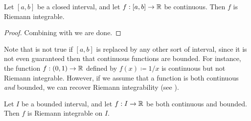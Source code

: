 \begin{cor}\label{i:11.5.2}
  Let \([a, b]\) be a closed interval, and let \(f : [a, b] \to \mathbb{R}\) be continuous.
  Then \(f\) is Riemann integrable.
\end{cor}

\begin{proof}
  Combining  with  we are done.
\end{proof}

\begin{note}
  Note that  is not true if \([a, b]\) is replaced by any other sort of interval, since it is not even guaranteed then that continuous functions are bounded.
  For instance, the function \(f : (0, 1) \to \mathbb{R}\) defined by \(f(x) \coloneqq 1 / x\) is continuous but not Riemann integrable.
  However, if we assume that a function is both continuous \emph{and} bounded, we can recover Riemann integrability (see ).
\end{note}

\begin{prop}\label{i:11.5.3}
  Let \(I\) be a bounded interval, and let \(f : I \to \mathbb{R}\) be both continuous and bounded.
  Then \(f\) is Riemann integrable on \(I\).
\end{prop}

